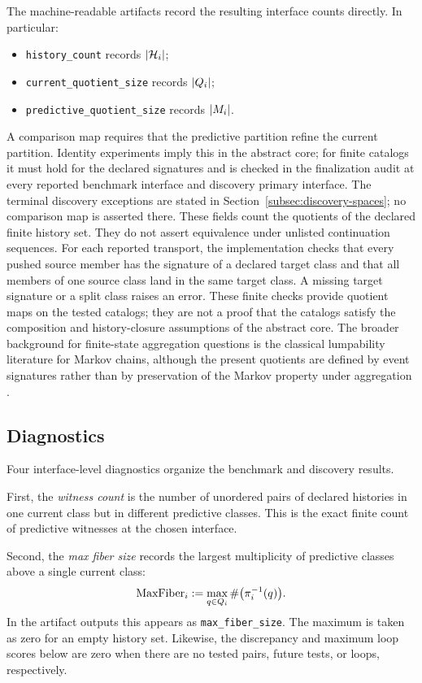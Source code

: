 \documentclass[11pt]{article}
\theoremstyle{definition}
\begin{document}
The machine-readable artifacts record the resulting interface counts directly. In particular:
\begin{itemize}
\item \texttt{history\_count} records $|\mathcal{H}_i|$;
\item \texttt{current\_quotient\_size} records $|Q_i|$;
\item \nolinkurl{predictive_quotient_size} records $|M_i|$.
\end{itemize}
A comparison map requires that the predictive partition refine the current partition. Identity experiments imply this in the abstract core; for finite catalogs it must hold for the declared signatures and is checked in the finalization audit at every reported benchmark interface and discovery primary interface. The terminal discovery exceptions are stated in Section~\ref{subsec:discovery-spaces}; no comparison map is asserted there. These fields count the quotients of the declared finite history set. They do not assert equivalence under unlisted continuation sequences. For each reported transport, the implementation checks that every pushed source member has the signature of a declared target class and that all members of one source class land in the same target class. A missing target signature or a split class raises an error. These finite checks provide quotient maps on the tested catalogs; they are not a proof that the catalogs satisfy the composition and history-closure assumptions of the abstract core.
The broader background for finite-state aggregation questions is the classical lumpability literature for Markov chains, although the present quotients are defined by event signatures rather than by preservation of the Markov property under aggregation \citep{KemenySnell1976FiniteMarkovChains,Buchholz1994ExactOrdinaryLumpability}.

\subsection{Diagnostics}\label{subsec:eff-diagnostics}
Four interface-level diagnostics organize the benchmark and discovery results.

First, the \emph{witness count} is the number of unordered pairs of declared histories in one current class but in different predictive classes. This is the exact finite count of predictive witnesses at the chosen interface.

Second, the \emph{max fiber size} records the largest multiplicity of predictive classes above a single current class:
\begin{equation}
\operatorname{MaxFiber}_i
:=
\max_{q\in Q_i}
\#\bigl(\pi_i^{-1}(q)\bigr).
\label{eq:max-fiber}
\end{equation}
In the artifact outputs this appears as \texttt{max\_fiber\_size}. The maximum is taken as zero for an empty history set. Likewise, the discrepancy and maximum loop scores below are zero when there are no tested pairs, future tests, or loops, respectively.
\end{document}
